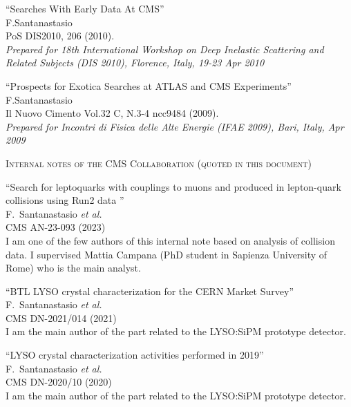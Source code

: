 \documentclass[10pt, a4paper]{article}
\begin{document}
\begin{thebibliography}{599}
``Searches With Early Data At CMS''\\
 F.Santanastasio\\
  PoS DIS2010, 206 (2010).\\
  {\it Prepared for 18th International Workshop on Deep Inelastic Scattering and Related Subjects (DIS 2010), Florence, Italy, 19-23 Apr 2010}

``Prospects for Exotica Searches at ATLAS and CMS Experiments''\\
 F.Santanastasio\\
Il Nuovo Cimento Vol.32 C, N.3-4 ncc9484 (2009).\\
{\it Prepared for Incontri di Fisica delle Alte Energie (IFAE 2009), Bari, Italy, Apr 2009}

\vspace{0.1cm} \begin{center} \textsc{Internal notes of the CMS
    Collaboration (quoted in this document)} \end{center} \vspace{0.05cm}

``Search for leptoquarks with couplings to muons and produced in lepton-quark collisions using Run2 data ''
  \\{}F.~Santanastasio {\it et al.}
  \\{}CMS AN-23-093 (2023)
  \\ I am one of the few authors of this internal note based on
  analysis of collision data. I supervised Mattia Campana (PhD student
  in Sapienza University of Rome) who is the main analyst.
  
``BTL LYSO crystal characterization for the CERN Market Survey''
  \\{}F.~Santanastasio {\it et al.}
  \\{}CMS DN-2021/014 (2021)
  \\ I am the main author of the part related to the LYSO:SiPM prototype detector.
  
``LYSO crystal characterization activities performed in 2019''
  \\{}F.~Santanastasio {\it et al.}
  \\{}CMS DN-2020/10 (2020)
  \\ I am the main author of the part related to the LYSO:SiPM prototype detector.


\end{thebibliography}
\end{document}
